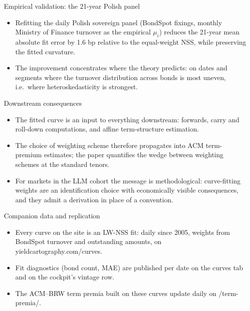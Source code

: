 \documentclass[aspectratio=169,11pt]{beamer}
\begin{document}
\begin{frame}{Empirical validation: the 21-year Polish panel}
  \begin{itemize}
    \item Refitting the daily Polish sovereign panel (BondSpot fixings,
          monthly Ministry of Finance turnover as the empirical $\mu_i$)
          reduces the 21-year mean absolute fit error by 1.6 bp relative to
          the equal-weight NSS, while preserving the fitted curvature.
    \item The improvement concentrates where the theory predicts: on dates
          and segments where the turnover distribution across bonds is most
          uneven, i.e.\ where heteroskedasticity is strongest.
  \end{itemize}
\end{frame}

\begin{frame}{Downstream consequences}
  \begin{itemize}
    \item The fitted curve is an input to everything downstream: forwards,
          carry and roll-down computations, and affine term-structure
          estimation.
    \item The choice of weighting scheme therefore propagates into ACM
          term-premium estimates; the paper quantifies the wedge between
          weighting schemes at the standard tenors.
    \item For markets in the LLM cohort the message is methodological:
          curve-fitting weights are an identification choice with
          economically visible consequences, and they admit a derivation
          in place of a convention.
  \end{itemize}
\end{frame}

\begin{frame}{Companion data and replication}
  \begin{itemize}
    \item Every curve on the site is an LW-NSS fit: daily since 2005, weights
          from BondSpot turnover and outstanding amounts, on
          \textcolor{ycaccent}{\ttfamily yieldcartography.com/curves}.
    \item Fit diagnostics (bond count, MAE) are published per date on the
          curves tab and on the cockpit's vintage row.
    \item The ACM--BRW term premia built on these curves update daily on
          \textcolor{ycaccent}{\ttfamily /term-premia/}.
  \end{itemize}
\end{frame}
\end{document}
